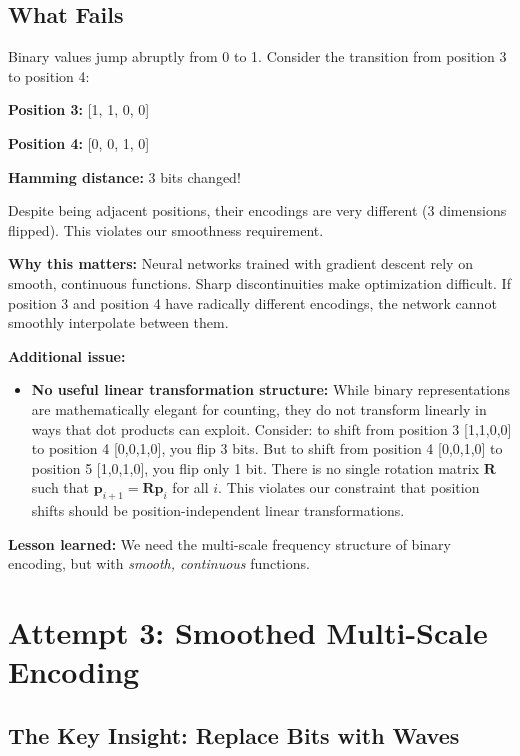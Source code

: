 \documentclass{article}
\begin{document}
\subsection{What Fails}

\begin{tcolorbox}[colback=red!5!white, colframe=red!75!black, title=Critical Problem: Discontinuity]
Binary values jump abruptly from 0 to 1. Consider the transition from position 3 to position 4:

\textbf{Position 3:} [1, 1, 0, 0]

\textbf{Position 4:} [0, 0, 1, 0]

\textbf{Hamming distance:} 3 bits changed!

Despite being adjacent positions, their encodings are very different (3 dimensions flipped). This violates our smoothness requirement.

\textbf{Why this matters:} Neural networks trained with gradient descent rely on smooth, continuous functions. Sharp discontinuities make optimization difficult. If position 3 and position 4 have radically different encodings, the network cannot smoothly interpolate between them.
\end{tcolorbox}

\textbf{Additional issue:}
\begin{itemize}
\item \textbf{No useful linear transformation structure:} While binary representations are mathematically elegant for counting, they do not transform linearly in ways that dot products can exploit. Consider: to shift from position 3 [1,1,0,0] to position 4 [0,0,1,0], you flip 3 bits. But to shift from position 4 [0,0,1,0] to position 5 [1,0,1,0], you flip only 1 bit. There is no single rotation matrix $\mathbf{R}$ such that $\mathbf{p}_{i+1} = \mathbf{R} \mathbf{p}_i$ for all $i$. This violates our constraint that position shifts should be position-independent linear transformations.
\end{itemize}

\textbf{Lesson learned:} We need the multi-scale frequency structure of binary encoding, but with \emph{smooth, continuous} functions.

\section{Attempt 3: Smoothed Multi-Scale Encoding}

\subsection{The Key Insight: Replace Bits with Waves}
\end{document}
